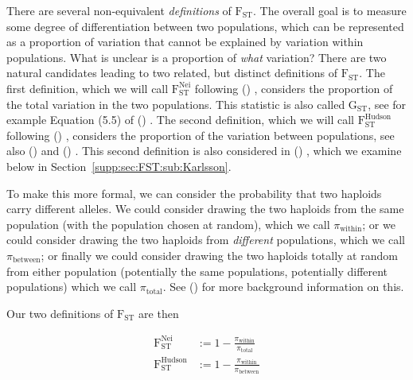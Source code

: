\documentclass[a4paper,fontsize=9pt,DIV=14]{scrartcl}
\newcommand\citeay[1]{\citeauthor{#1} (\citeyear{#1}) \cite{#1}}
\newcommand\secref[1]{Section~\ref{#1}}
\begin{document}

\label{supp:sec:FST:sub:Definition}

There are several non-equivalent \emph{definitions} of $\text{F}_\text{ST}$.
The overall goal is to measure some degree of differentiation between two populations, which can be represented as a proportion of variation that cannot be explained by variation within populations.
What is unclear is a proportion of \emph{what} variation?
There are two natural candidates leading to two related, but distinct definitions of $\text{F}_\text{ST}$.
The first definition, which we will call $\text{F}_\text{ST}^\text{Nei}$ following \citeay{Nei1973}, considers the proportion of the total variation in the two populations.
This statistic is also called $\text{G}_\text{ST}$, see for example Equation (5.5) of \citeay{Hahn2018}.
The second definition, which we will call $\text{F}_\text{ST}^\text{Hudson}$ following \citeay{Hudson1992}, considers the proportion of the variation between populations, see also \citeay{Cockerham1969} and \citeay{Weir2002}.
This second definition is also considered in \citeay{Karlsson2007}, which we examine below in \secref{supp:sec:FST:sub:Karlsson}.

To make this more formal, we can consider the probability that two haploids carry different alleles.
We could consider drawing the two haploids from the same population (with the population chosen at random), which we call $\pi_\text{within}$; or we could consider drawing the two haploids from \emph{different} populations, which we call $\pi_\text{between}$; or finally we could consider drawing the two haploids totally at random from either population (potentially the same populations, potentially different populations) which we call $\pi_\text{total}$.
See \citeay{Bhatia2013} for more background information on this.

Our two definitions of $\text{F}_\text{ST}$ are then

\begin{align}
    \text{F}_\text{ST}^\text{Nei}    &:= 1 - \frac{\pi_\text{within}}{\pi_\text{total}} \label{eq:popnei}\\
    \text{F}_\text{ST}^\text{Hudson} &:= 1 - \frac{\pi_\text{within}}{\pi_\text{between}} \label{eq:pophudson}
\end{align}
\end{document}
